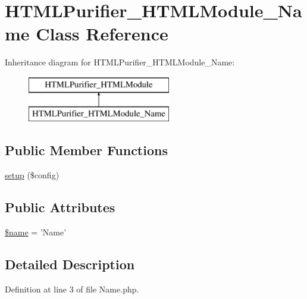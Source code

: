\hypertarget{classHTMLPurifier__HTMLModule__Name}{\section{H\+T\+M\+L\+Purifier\+\_\+\+H\+T\+M\+L\+Module\+\_\+\+Name Class Reference}
\label{classHTMLPurifier__HTMLModule__Name}
}
Inheritance diagram for H\+T\+M\+L\+Purifier\+\_\+\+H\+T\+M\+L\+Module\+\_\+\+Name\+:\begin{figure}[H]
\begin{center}
\leavevmode
\includegraphics[height=2.000000cm]{classHTMLPurifier__HTMLModule__Name}
\end{center}
\end{figure}
\subsection*{Public Member Functions}
\begin{DoxyCompactItemize}
\item 
\hyperlink{classHTMLPurifier__HTMLModule__Name_a0252f70e91436180243af912ed1aef90}{setup} (\$config)
\end{DoxyCompactItemize}
\subsection*{Public Attributes}
\begin{DoxyCompactItemize}
\item 
\hyperlink{classHTMLPurifier__HTMLModule__Name_a5500ae6159a3930e44d73b4f4bc827cc}{\$name} = 'Name'
\end{DoxyCompactItemize}


\subsection{Detailed Description}


Definition at line 3 of file Name.\+php.




